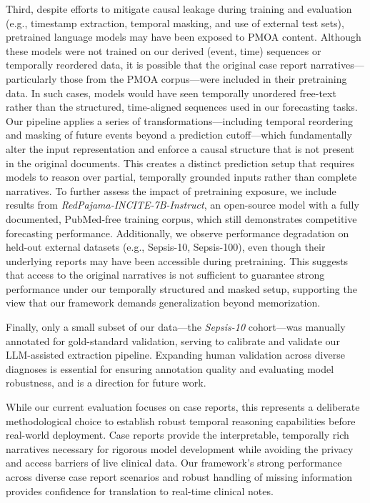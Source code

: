 Third, despite efforts to mitigate causal leakage during training and evaluation (e.g., timestamp extraction, temporal masking, and use of external test sets), pretrained language models may have been exposed to PMOA content. 
Although these models were not trained on our derived (event, time) sequences or temporally reordered data, it is possible that the original case report narratives—particularly those from the PMOA corpus—were included in their pretraining data.
In such cases, models would have seen temporally unordered free-text rather than the structured, time-aligned sequences used in our forecasting tasks. Our pipeline applies a series of transformations—including temporal reordering and masking of future events beyond a prediction cutoff—which fundamentally alter the input representation and enforce a causal structure that is not present in the original documents. This creates a distinct prediction setup that requires models to reason over partial, temporally grounded inputs rather than complete narratives. 
To further assess the impact of pretraining exposure, we include results from \textit{RedPajama-INCITE-7B-Instruct}, an open-source model with a fully documented, PubMed-free training corpus, which still demonstrates competitive forecasting performance. Additionally, we observe performance degradation on held-out external datasets (e.g., Sepsis-10, Sepsis-100), even though their underlying reports may have been accessible during pretraining. This suggests that access to the original narratives is not sufficient to guarantee strong performance under our temporally structured and masked setup, supporting the view that our framework demands generalization beyond memorization.

Finally, only a small subset of our data—the \textit{Sepsis-10} cohort—was manually annotated for gold-standard validation, serving to calibrate and validate our LLM-assisted extraction pipeline. Expanding human validation across diverse diagnoses is essential for ensuring annotation quality and evaluating model robustness, and is a direction for future work.


While our current evaluation focuses on case reports, this represents a deliberate methodological choice to establish robust temporal reasoning capabilities before real-world deployment. 
Case reports provide the interpretable, temporally rich narratives necessary for rigorous model development while avoiding the privacy and access barriers of live clinical data. 
Our framework's strong performance across diverse case report scenarios and robust handling of missing information provides confidence for translation to real-time clinical notes.

